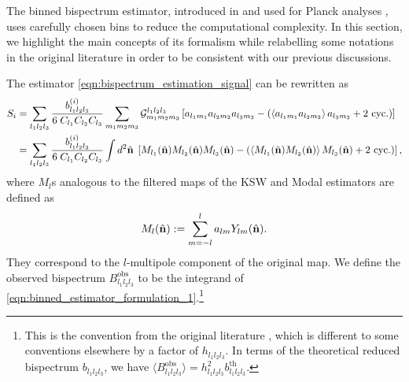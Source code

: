 The binned bispectrum estimator, introduced in \cite{Bucher2010} and used for Planck analyses \cite{PlanckCollaboration2013,PlanckCollaboration2015,PlanckCollaboration2018,Bucher2016}, uses carefully chosen bins to reduce the computational complexity. In this section, we highlight the main concepts of its formalism while relabelling some notations in the original literature \cite{Bucher2010} in order to be consistent with our previous discussions.

The estimator \eqref{eqn:bispectrum_estimation_signal} can be rewritten as 
\begin{align}
	S_i &= \sum_{l_1 l_2 l_3}  \frac{b^{(i)}_{l_1 l_2 l_3}}{6 \; C_{l_1} C_{l_2} C_{l_3}} \sum_{m_1 m_2 m_3} \mathcal{G}^{l_1 l_2 l_3}_{m_1 m_2 m_3} \left[ a_{l_1 m_1} a_{l_2 m_2} a_{l_3 m_3} - \left( \left< a_{l_1 m_1} a_{l_2 m_2} \right> a_{l_3 m_3} + \text{2 cyc.} \right) \right] \\
	&= \sum_{l_1 l_2 l_3}  \frac{b^{(i)}_{l_1 l_2 l_3}}{6 \; C_{l_1} C_{l_2} C_{l_3}} \int d^2 \hat{\mathbf{n}} \; \left[ M_{l_1} (\hat{\mathbf{n}}) M_{l_2} (\hat{\mathbf{n}}) M_{l_3} (\hat{\mathbf{n}}) - \left( \left< M_{l_1} (\hat{\mathbf{n}}) M_{l_2} (\hat{\mathbf{n}}) \right> M_{l_3} (\hat{\mathbf{n}}) + \text{2 cyc.}\right)  \right], \label{eqn:binned_estimator_formulation_1}
\end{align}
where $M_l$s analogous to the filtered maps of the KSW and Modal estimators are defined as
\begin{align}
	M_l(\hat{\mathbf{n}}) := \sum_{m=-l}^{l} a_{lm} Y_{lm}(\hat{\mathbf{n}}).
\end{align}
They correspond to the $l$-multipole component of the original map. We define the observed bispectrum $B^\text{obs}_{l_1 l_2 l_3}$ to be the integrand of \eqref{eqn:binned_estimator_formulation_1}.\footnote{This is the convention from the original literature \cite{Bucher2010}, which is different to some conventions elsewhere by a factor of $h_{l_1 l_2 l_3}$. In terms of the theoretical reduced bispectrum $b_{l_1 l_2 l_3}$, we have $\langle B^\text{obs}_{l_1 l_2 l_3} \rangle = h^2_{l_1 l_2 l_3} b^\text{th}_{l_1 l_2 l_3}$.}


